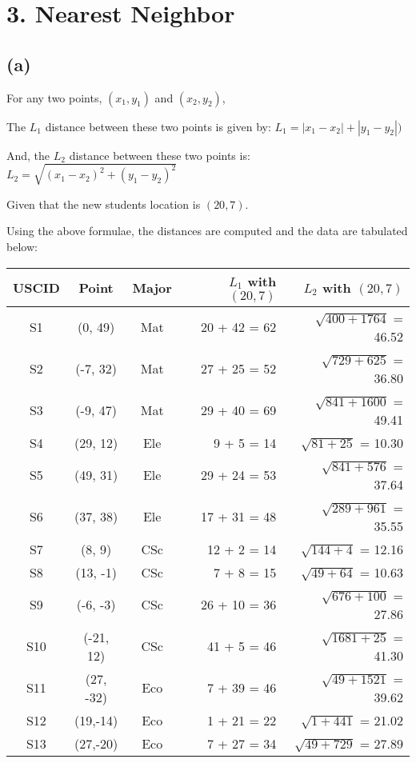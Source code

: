 \documentclass[letterpaper,doc,notimes]{apa6}
\begin{document}
\section{3. Nearest Neighbor}

\subsection{(a)}

For any two points, $(x_1, y_1)$ and $(x_2, y_2)$,

The $L_1$ distance between these two points is given by:
$L_1 = |x_1 - x_2| + |y_1 - y_2|)$

And, the $L_2$ distance between these two points is:
$L_2 = \sqrt{(x_1 - x_2)^2 + (y_1 - y_2)^2}$

Given that the new students location is $ (20, 7)$. 

Using the above formulae, the distances are computed and the data are tabulated below:

\begin{tabular}{| c | c | c || r || r |}
	\hline			
	USCID  & Point & Major & $L_1$ with $(20, 7)$ & $L_2$ with $(20, 7)$\\
	\hline
	S1  &  (0, 49)  & Mat & 20 + 42 = 62 & $\sqrt{400 + 1764}$ = 46.52 \\
	S2  &  (-7, 32) & Mat & 27 + 25 = 52 & $\sqrt{729 + 625}$ = 36.80  \\
	S3  &  (-9, 47) & Mat & 29 + 40 = 69 & $\sqrt{841 + 1600}$ = 49.41 \\
	S4  &  (29, 12) & Ele &   9 + 5 = 14 & $\sqrt{81 + 25}$ = 10.30    \\
	S5  &  (49, 31) & Ele & 29 + 24 = 53 & $\sqrt{841 + 576}$ = 37.64 \\
	S6  &  (37, 38) & Ele & 17 + 31 = 48 & $\sqrt{289 + 961}$ = 35.55 \\
	S7  &  (8, 9)   & CSc &  12 + 2 = 14 & $\sqrt{144 + 4}$ = 12.16 \\
	S8  &  (13, -1) & CSc &   7 + 8 = 15 & $\sqrt{49 + 64}$ = 10.63 \\
	S9  &  (-6, -3) & CSc & 26 + 10 = 36 & $\sqrt{676 + 100}$ = 27.86 \\
	S10  & (-21, 12) & CSc &  41 + 5 = 46 & $\sqrt{1681 + 25}$ = 41.30\\
	S11  & (27, -32) & Eco &  7 + 39 = 46 & $\sqrt{49 + 1521}$ = 39.62\\
	S12  &  (19,-14) & Eco &  1 + 21 = 22 & $\sqrt{1+ 441}$ =  21.02\\
	S13  &  (27,-20) & Eco &  7 + 27 = 34 & $\sqrt{49 + 729}$ = 27.89\\
	\hline
\end{tabular}
\end{document}
